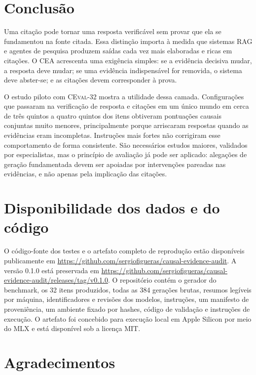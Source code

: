 \documentclass[10pt,twocolumn]{article}
\newcommand{\method}{\textsc{CEA}}
\newcommand{\dataset}{\textsc{CEval-32}}
\begin{document}
\section{Conclusão}

Uma citação pode tornar uma resposta verificável sem provar que ela se fundamentou na fonte citada. Essa distinção importa à medida que sistemas RAG e agentes de pesquisa produzem saídas cada vez mais elaboradas e ricas em citações. O \method{} acrescenta uma exigência simples: se a evidência decisiva mudar, a resposta deve mudar; se uma evidência indispensável for removida, o sistema deve abster-se; e as citações devem corresponder à prova.

O estudo piloto com \dataset{} mostra a utilidade dessa camada. Configurações que passaram na verificação de resposta e citações em um único mundo em cerca de três quintos a quatro quintos dos itens obtiveram pontuações causais conjuntas muito menores, principalmente porque arriscaram respostas quando as evidências eram incompletas. Instruções mais fortes não corrigiram esse comportamento de forma consistente. São necessários estudos maiores, validados por especialistas, mas o princípio de avaliação já pode ser aplicado: alegações de geração fundamentada devem ser apoiadas por intervenções pareadas nas evidências, e não apenas pela implicação das citações.

\section*{Disponibilidade dos dados e do código}

O código-fonte dos testes e o artefato completo de reprodução estão disponíveis publicamente em \url{https://github.com/sergiofigueras/causal-evidence-audit}. A versão 0.1.0 está preservada em \url{https://github.com/sergiofigueras/causal-evidence-audit/releases/tag/v0.1.0}. O repositório contém o gerador do benchmark, os 32 itens produzidos, todas as 384 gerações brutas, resumos legíveis por máquina, identificadores e revisões dos modelos, instruções, um manifesto de proveniência, um ambiente fixado por hashes, código de validação e instruções de execução. O artefato foi concebido para execução local em Apple Silicon por meio do MLX e está disponível sob a licença MIT.

\section*{Agradecimentos}
\end{document}
